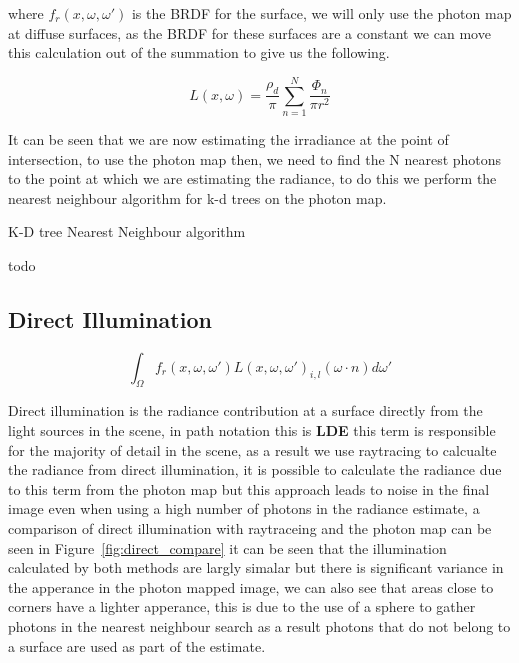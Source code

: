 where $f_r(x, \omega,\omega')$ is the BRDF for the surface, we will only use the photon map at diffuse surfaces, as the BRDF
for these surfaces are a constant we can move this calculation out of the summation to give us the following.

\begin{equation}
L(x, \omega) = \frac{\rho_d}{\pi}\sum\limits_{n = 1}^N \frac{\Phi_n}{\pi r ^ 2}
\end{equation}

It can be seen that we are now estimating the irradiance at the point of intersection, to use the photon map then, we need to
find the N nearest photons to the point at which we are estimating the radiance, to do this we perform the nearest neighbour
algorithm for k-d trees on the photon map.

\begin{algorithm}
\begin{algorithmic}
\caption{K-D tree Nearest Neighbour algorithm}
\State todo
\end{algorithmic}
\end{algorithm}

\subsection{Direct Illumination}
\begin{equation*}
			\int_{\Omega}
				f_{r}(x, \omega, \omega')
				L(x,\omega,\omega')_{i,l}
				(\omega \cdot n)d\omega'
\end{equation*}

Direct illumination is the radiance contribution at a surface directly from the light sources in the scene, in path notation
this is \textbf{LDE} this term is responsible for the majority of detail in the scene, as a result we use raytracing to calcualte
the radiance from direct illumination, it is possible to calculate the radiance due to this term from the photon map but this
approach leads to noise in the final image even when using a high number of photons in the radiance estimate, a comparison of
direct illumination with raytraceing and the photon map can be seen in Figure~\ref{fig:direct_compare} it can be seen that
the illumination calculated by both methods are largly simalar but there is significant variance in the apperance in the
photon mapped image, we can also see that areas close to corners have a lighter apperance, this is due to the use of a
sphere to gather photons in the nearest neighbour search as a result photons that do not belong to a surface are used
as part of the estimate.

